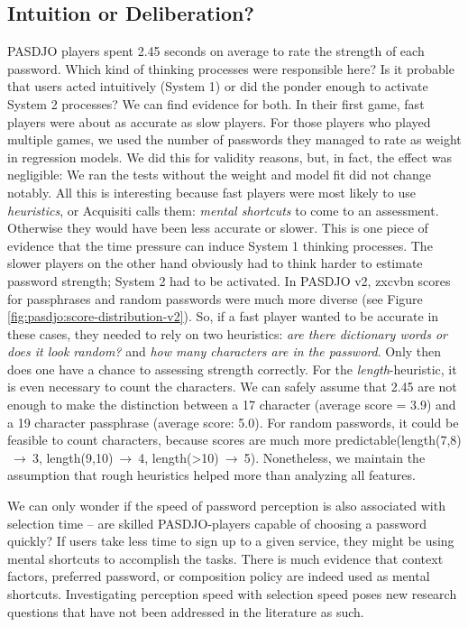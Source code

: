 \subsection{Intuition or Deliberation?}
PASDJO players spent 2.45 seconds on average to rate the strength of each password. Which kind of thinking processes were responsible here? Is it probable that users acted intuitively (System 1) or did the ponder enough to activate System 2 processes? We can find evidence for both. 
In their first game, fast players were about as accurate as slow players. For those players who played multiple games, we used the number of passwords they managed to rate as weight in regression models. We did this for validity reasons, but, in fact, the effect was negligible: We ran the tests without the weight and model fit did not change notably. All this is interesting because fast players were most likely to use \textit{heuristics}, or Acquisiti \etal calls them: \textit{mental shortcuts} to come to an assessment. Otherwise they would have been less accurate or slower. This is one piece of evidence that the time pressure can induce System 1 thinking processes. The slower players on the other hand obviously had to think harder to estimate password strength; System 2 had to be activated. 
In PASDJO v2, zxcvbn scores for passphrases and random passwords were much more diverse (see Figure \ref{fig:pasdjo:score-distribution-v2}). So, if a fast player wanted to be accurate in these cases, they needed to rely on two heuristics: \textit{are there dictionary words or does it look random?} and \textit{how many characters are in the password}. Only then does one have a chance to assessing strength correctly. For the \textit{length}-heuristic, it is even necessary to count the characters. We can safely assume that 2.45 are not enough to make the distinction between a 17 character (average score = 3.9) and a 19 character passphrase (average score: 5.0). For random passwords, it could be feasible to count characters, because scores are much more predictable(length(7,8)$~\rightarrow~$3, length(9,10)$~\rightarrow~$4, length(>10)$~\rightarrow~$5). Nonetheless, we maintain the assumption that rough heuristics helped more than analyzing all features. 

We can only wonder if the speed of password perception is also associated with selection time -- are skilled PASDJO-players capable of choosing a password quickly? If users take less time to sign up to a given service, they might be using mental shortcuts to accomplish the tasks. There is much evidence that context factors, preferred password, or composition policy are indeed used as mental shortcuts. Investigating perception speed with selection speed poses new research questions that have not been addressed in the literature as such. 

